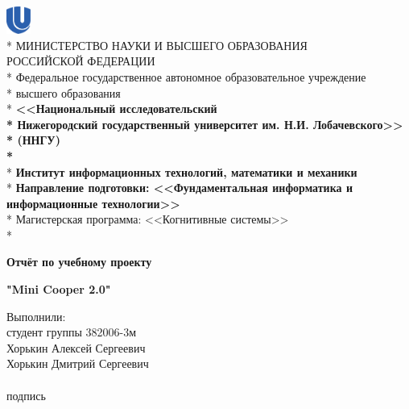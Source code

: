 \begin{titlepage}
	\newpage
	\begin{center}
		\includegraphics[width=0.8cm]{logo_unn_crop.eps} \\*
		МИНИСТЕРСТВО НАУКИ И ВЫСШЕГО ОБРАЗОВАНИЯ\\
		РОССИЙСКОЙ ФЕДЕРАЦИИ
		\\*
		Федеральное государственное автономное образовательное учреждение\\* высшего образования \\*
		\textbf{<<Национальный исследовательский \\* Нижегородский государственный университет им. Н.И. Лобачевского>>\\* (ННГУ)\\*}\\*
		\vspace{2em}
		\textbf{Институт информационных технологий, математики и механики}\\*
		\textbf{Направление подготовки: <<Фундаментальная информатика и информационные технологии>>}\\*
		\vspace{2em}
		Магистерская программа: <<Когнитивные системы>>\\*
	\end{center}


	\vspace{3em}

	\begin{center}
		{\Large \textbf{Отчёт по учебному проекту}}
    \end{center}
    \begin{center}
		{\Large \textbf{"Mini Cooper 2.0"}}
    \end{center}

    \vspace{4em}

    \hfill
    \begin{minipage}[t]{.36\linewidth}
    	\begin{flushleft}
    	
			Выполнили:\\
			студент группы 382006-3м\\
			Хорькин Алексей Сергеевич\\
			Хорькин Дмитрий Сергеевич\\
			\vspace{1.0em}
			\hrulefill \\
			{\small подпись}\\
			

\end{flushleft}
\end{minipage}
\end{titlepage}
